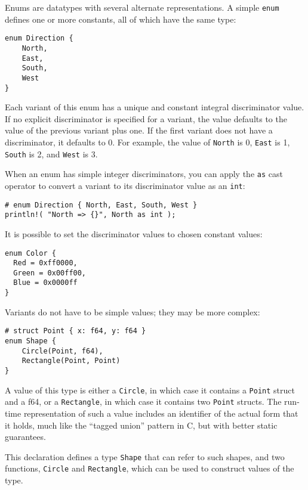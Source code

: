 \documentclass[]{article}
\begin{document}
Enums are datatypes with several alternate representations. A simple
\texttt{enum} defines one or more constants, all of which have the same
type:

\begin{verbatim}
enum Direction {
    North,
    East,
    South,
    West
}
\end{verbatim}

Each variant of this enum has a unique and constant integral
discriminator value. If no explicit discriminator is specified for a
variant, the value defaults to the value of the previous variant plus
one. If the first variant does not have a discriminator, it defaults to
0. For example, the value of \texttt{North} is 0, \texttt{East} is 1,
\texttt{South} is 2, and \texttt{West} is 3.

When an enum has simple integer discriminators, you can apply the
\texttt{as} cast operator to convert a variant to its discriminator
value as an \texttt{int}:

\begin{verbatim}
# enum Direction { North, East, South, West }
println!( "North => {}", North as int );
\end{verbatim}

It is possible to set the discriminator values to chosen constant
values:

\begin{verbatim}
enum Color {
  Red = 0xff0000,
  Green = 0x00ff00,
  Blue = 0x0000ff
}
\end{verbatim}

Variants do not have to be simple values; they may be more complex:

\begin{verbatim}
# struct Point { x: f64, y: f64 }
enum Shape {
    Circle(Point, f64),
    Rectangle(Point, Point)
}
\end{verbatim}

A value of this type is either a \texttt{Circle}, in which case it
contains a \texttt{Point} struct and a f64, or a \texttt{Rectangle}, in
which case it contains two \texttt{Point} structs. The run-time
representation of such a value includes an identifier of the actual form
that it holds, much like the ``tagged union'' pattern in C, but with
better static guarantees.

This declaration defines a type \texttt{Shape} that can refer to such
shapes, and two functions, \texttt{Circle} and \texttt{Rectangle}, which
can be used to construct values of the type.
\end{document}
